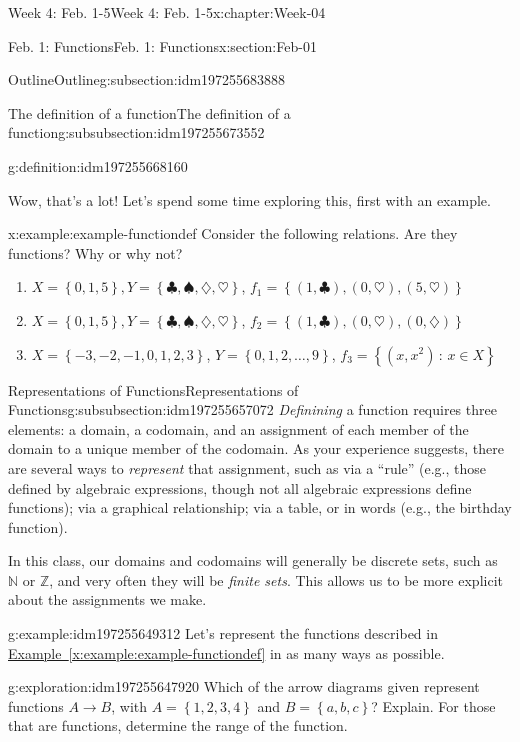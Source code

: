 \documentclass[oneside,10pt,]{book}
\newcommand{\xreffont}{\relax}
\numberwithin{equation}{section}
\newcommand{\set}[1]{\left\{ {#1} \right\}}
\newcommand{\setof}[2]{{\left\{#1\,\colon\,#2\right\}}}
\def\Z{{\mathbb Z}}
\def\N{{\mathbb N}}
\newcommand{\N}{\mathbb N}
\newcommand{\Z}{\mathbb Z}
\begin{document}
\begin{chapterptx}{Week 4: Feb. 1-5}{}{Week 4: Feb. 1-5}{}{}{x:chapter:Week-04}
\begin{sectionptx}{Feb. 1: Functions}{}{Feb. 1: Functions}{}{}{x:section:Feb-01}
\begin{subsectionptx}{Outline}{}{Outline}{}{}{g:subsection:idm197255683888}
\begin{subsubsectionptx}{The definition of a function}{}{The definition of a function}{}{}{g:subsubsection:idm197255673552}
\begin{definition}{}{g:definition:idm197255668160}
\end{definition}
Wow, that's a lot! Let's spend some time exploring this, first with an example.%
\begin{example}{}{x:example:example-functiondef}%
Consider the following relations. Are they functions? Why or why not?%
%
\begin{enumerate}
\item{}\(X=\set{0,1,5}, Y = \set{\clubsuit, \spadesuit, \diamondsuit, \heartsuit}\), \(f_1 = \set{(1,\clubsuit), (0, \heartsuit), (5,\heartsuit)}\)%
\item{}\(X=\set{0,1,5}, Y = \set{\clubsuit, \spadesuit, \diamondsuit, \heartsuit}\), \(f_2 = \set{(1,\clubsuit), (0, \heartsuit), (0,\diamondsuit)}\)%
\item{}\(X = \set{-3,-2,-1,0,1,2,3}\), \(Y = \set{0,1,2,\ldots,9}\), \(f_3 = \setof{(x,x^2)}{x\in X}\)%
\end{enumerate}
\end{example}
\end{subsubsectionptx}
%
%
\typeout{************************************************}
\typeout{************************************************}
%
\begin{subsubsectionptx}{Representations of Functions}{}{Representations of Functions}{}{}{g:subsubsection:idm197255657072}
\emph{Definining} a function requires three elements: a domain, a codomain, and an assignment of each member of the domain to a unique member of the codomain. As your experience suggests, there are several ways to \emph{represent} that assignment, such as via a ``rule'' (e.g., those defined by algebraic expressions, though not all algebraic expressions define functions); via a graphical relationship; via a table, or in words (e.g., the birthday function).%
\par
In this class, our domains and codomains will generally be discrete sets, such as \(\N\) or \(\Z\), and very often they will be \emph{finite sets}. This allows us to be more explicit about the assignments we make.%
\begin{example}{}{g:example:idm197255649312}%
Let's represent the functions described in \hyperref[x:example:example-functiondef]{Example~{\xreffont\ref{x:example:example-functiondef}}} in as many ways as possible.%
\end{example}
\begin{exploration}{}{g:exploration:idm197255647920}%
Which of the arrow diagrams given represent functions \(A\to B\), with \(A = \set{1,2,3,4}\) and \(B = \set{a,b,c}\)? Explain. For those that are functions, determine the range of the function.%

\end{exploration}
\end{subsubsectionptx}
\end{subsectionptx}
\end{sectionptx}
\end{chapterptx}
\end{document}
